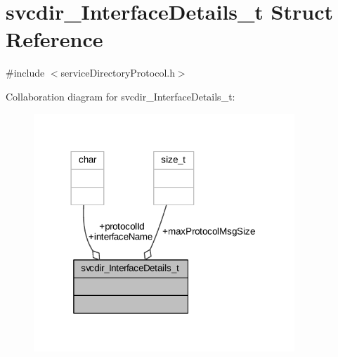\hypertarget{structsvcdir___interface_details__t}{}\section{svcdir\+\_\+\+Interface\+Details\+\_\+t Struct Reference}
\label{structsvcdir___interface_details__t}


{\ttfamily \#include $<$service\+Directory\+Protocol.\+h$>$}



Collaboration diagram for svcdir\+\_\+\+Interface\+Details\+\_\+t\+:
\nopagebreak
\begin{figure}[H]
\begin{center}
\leavevmode
\includegraphics[width=278pt]{structsvcdir___interface_details__t__coll__graph}
\end{center}
\end{figure}
